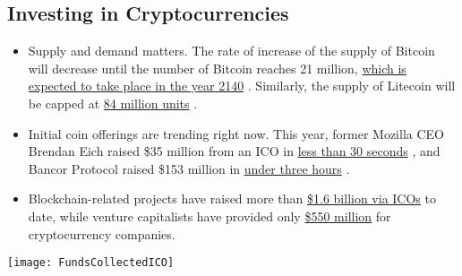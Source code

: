 \documentclass[11pt,fleqn]{book} %
\begin{document}
	\subsection{Investing in Cryptocurrencies}
		\begin{itemize}
			\item Supply and demand matters. The rate of increase of the supply of Bitcoin will decrease until the number 
			of Bitcoin reaches 21 million, 
			\href{https://www.coindesk.com/top-10-bitcoin-myths-debunked/}{which is expected to take place in the year 2140}
			\cite{mythsDebunked}. Similarly, 
			the supply of Litecoin will be capped at 
			\href{https://support.xbtce.info/Knowledgebase/Article/View/152/59/about-litecoin}{84 million units}
			\cite{ltcLimits}.
			\item Initial coin offerings are trending right now. This year, former Mozilla CEO Brendan Eich raised \$35 
			million from an ICO in 
			\href{https://techcrunch.com/2017/06/01/brave-ico-35-million-30-seconds-brendan-eich/}{less than 30 seconds}
			\cite{techCrunch}, 
			and Bancor Protocol raised \$153 million in 
			\href{https://www.google.com/search?q=Bancor+Protoco+ico&oq=Bancor+Protocol+ico&gs_l=psy-ab.3..0i13k1l2.253.542.0.578.4.3.0.0.0.0.177.320.0j2.2.0....0...1.1.64.psy-ab..3.1.176.LOjRpj0hKrM}{under three hours}
			\cite{bancorProtocol}.
			\item Blockchain-related projects have raised more than 
			\href{https://www.coindesk.com/1-6-billion-all-time-ico-funding-climbs-as-record-500-million-invested-in-july/}{\$1.6 billion via ICOs} 
			\cite{coindeskICOAllTimeHigh} 
			to date, while venture capitalists have provided only 
			\href{http://my.pitchbook.com/?pbr=14763750}{\$550 million} \cite{pitchbook} for cryptocurrency companies.
		\end{itemize}
		\begin{center}
			\texttt{[image: FundsCollectedICO]}
		\end{center}
\end{document}
